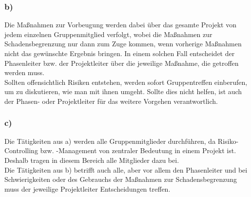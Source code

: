 \documentclass{swp1}
\begin{document}
\subsubsection*{b)}
Die Maßnahmen zur Vorbeugung werden dabei über das gesamte Projekt von jedem einzelnen Gruppenmitglied verfolgt, wobei die Maßnahmen zur Schadensbegrenzung nur dann zum Zuge kommen, wenn vorherige Maßnahmen nicht das gewünschte Ergebnis bringen. In einem solchen Fall entscheidet der Phasenleiter bzw. der Projektleiter über die jeweilige Maßnahme, die getroffen werden muss.\\
Sollten offensichtlich Risiken entstehen, werden sofort Gruppentreffen einberufen, um zu diskutieren, wie man mit ihnen umgeht. Sollte dies nicht helfen, ist auch der Phasen- oder Projektleiter für das weitere Vorgehen verantwortlich.
\subsubsection*{c)}
Die Tätigkeiten aus a) werden alle Gruppenmitglieder durchführen, da Risiko-Controlling bzw. -Management von zentraler Bedeutung in einem Projekt ist. Deshalb tragen in diesem Bereich alle Mitglieder dazu bei.\\

Die Tätigkeiten aus b) betrifft auch alle, aber vor allem den Phasenleiter und bei Schwierigkeiten oder des Gebrauchs der Maßnahmen zur Schadensbegrenzung muss der jeweilige Projektleiter Entscheidungen treffen.
\end{document}
